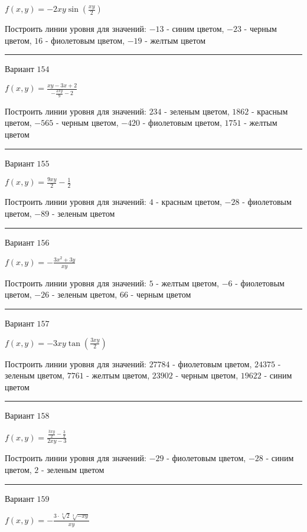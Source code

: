 \documentclass[11pt]{report}
\begin{document}
$f(x, y) = - 2 x y \sin{\left(\frac{x y}{2} \right)}$

Построить линии уровня для значений: $-13$ - синим цветом, $-23$ - черным цветом, $16$ - фиолетовым цветом, $-19$ - желтым цветом
\begin{center}
\noindent\rule{8cm}{0.4pt}
\end{center}
Вариант $154$


$f(x, y) = \frac{x y - 3 x + 2}{- \frac{2 x y}{9} - 2}$

Построить линии уровня для значений: $234$ - зеленым цветом, $1862$ - красным цветом, $-565$ - черным цветом, $-420$ - фиолетовым цветом, $1751$ - желтым цветом
\begin{center}
\noindent\rule{8cm}{0.4pt}
\end{center}
Вариант $155$


$f(x, y) = \frac{9 x y}{2} - \frac{1}{2}$

Построить линии уровня для значений: $4$ - красным цветом, $-28$ - фиолетовым цветом, $-89$ - зеленым цветом
\begin{center}
\noindent\rule{8cm}{0.4pt}
\end{center}
Вариант $156$


$f(x, y) = - \frac{3 x^{2} + 3 y}{x y}$

Построить линии уровня для значений: $5$ - желтым цветом, $-6$ - фиолетовым цветом, $-26$ - зеленым цветом, $66$ - черным цветом
\begin{center}
\noindent\rule{8cm}{0.4pt}
\end{center}
Вариант $157$


$f(x, y) = - 3 x y \tan{\left(\frac{3 x y}{2} \right)}$

Построить линии уровня для значений: $27784$ - фиолетовым цветом, $24375$ - зеленым цветом, $7761$ - желтым цветом, $23902$ - черным цветом, $19622$ - синим цветом
\begin{center}
\noindent\rule{8cm}{0.4pt}
\end{center}
Вариант $158$


$f(x, y) = \frac{\frac{3 x y}{2} - \frac{3}{2}}{2 x y - 3}$

Построить линии уровня для значений: $-29$ - фиолетовым цветом, $-28$ - синим цветом, $2$ - зеленым цветом
\begin{center}
\noindent\rule{8cm}{0.4pt}
\end{center}
Вариант $159$


$f(x, y) = - \frac{3 \cdot \sqrt[3]{2} \sqrt[3]{- x y}}{x y}$
\end{document}
